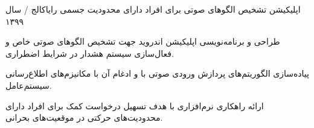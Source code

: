 \begin{cventries}
	\cventry
	{اپلیکیشن تشخیص الگوهای صوتی برای افراد دارای محدودیت جسمی} %
	{}
	{رایاکالج / }
	{سال ۱۳۹۹}
	{
		\begin{cvitems}
			\item {طراحی و برنامه‌نویسی اپلیکیشن اندروید جهت تشخیص الگوهای صوتی خاص و فعال‌سازی سیستم هشدار در شرایط اضطراری.}
			\item {پیاده‌سازی الگوریتم‌های پردازش ورودی صوتی با  و ادغام آن با مکانیزم‌های اطلاع‌رسانی سیستم‌عامل.}
			\item {ارائه راهکاری نرم‌افزاری با هدف تسهیل درخواست کمک برای افراد دارای محدودیت‌های حرکتی در موقعیت‌های بحرانی.}
		\end{cvitems}
	}
	
\end{cventries}


